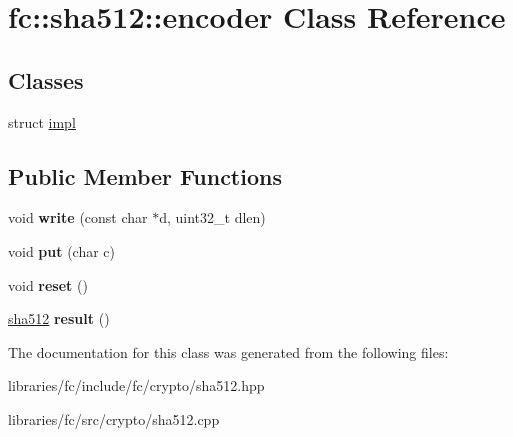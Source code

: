 \hypertarget{classfc_1_1sha512_1_1encoder}{}\section{fc\+:\+:sha512\+:\+:encoder Class Reference}
\label{classfc_1_1sha512_1_1encoder}
\subsection*{Classes}
\begin{DoxyCompactItemize}
\item 
struct \mbox{\hyperlink{structfc_1_1sha512_1_1encoder_1_1impl}{impl}}
\end{DoxyCompactItemize}
\subsection*{Public Member Functions}
\begin{DoxyCompactItemize}
\item 
\mbox{\label{classfc_1_1sha512_1_1encoder_a50bea285b9557fb420a434e0f7b46c66}} 
void {\bfseries write} (const char $\ast$d, uint32\+\_\+t dlen)
\item 
\mbox{\label{classfc_1_1sha512_1_1encoder_a4a79c25a0053ff0fbe5be2a76f56869c}} 
void {\bfseries put} (char c)
\item 
\mbox{\label{classfc_1_1sha512_1_1encoder_a937708b9618e36bb01409cfe40f07b8d}} 
void {\bfseries reset} ()
\item 
\mbox{\label{classfc_1_1sha512_1_1encoder_a11d1c279300d2ee6e5d411dc98404fb6}} 
\mbox{\hyperlink{classfc_1_1sha512}{sha512}} {\bfseries result} ()
\end{DoxyCompactItemize}


The documentation for this class was generated from the following files\+:\begin{DoxyCompactItemize}
\item 
libraries/fc/include/fc/crypto/sha512.\+hpp\item 
libraries/fc/src/crypto/sha512.\+cpp\end{DoxyCompactItemize}
